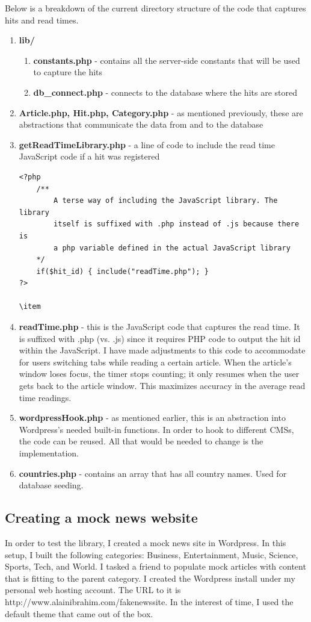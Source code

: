 \documentclass[12pt]{article}
\begin{document}
\newpage

\noindent Below is a breakdown of the current directory structure of the code that captures hits and read times.
\begin{enumerate}
\item \textbf{lib/}
\begin{enumerate}
\item \textbf{constants.php} - contains all the server-side constants that will be used to capture the hits
\item \textbf{db\_connect.php} - connects to the database where the hits are stored
\end{enumerate}
\item \textbf{Article.php, Hit.php, Category.php} - as mentioned previously, these are abstractions that communicate the data from and to the database
\item \textbf{getReadTimeLibrary.php} - a line of code to include the read time JavaScript code if a hit was registered
\begin{lstlisting}[basicstyle=\scriptsize]
<?php 
	/**
		A terse way of including the JavaScript library. The library 
		itself is suffixed with .php instead of .js because there is 
		a php variable defined in the actual JavaScript library
	*/
	if($hit_id) { include("readTime.php"); } 
?>

\item
\end{lstlisting}
\item \textbf{readTime.php} - this is the JavaScript code that captures the read time. It is suffixed with .php (vs. .js) since it requires PHP code to output the hit id within the JavaScript. I have made adjustments to this code to accommodate for users switching tabs while reading a certain article. When the article's window loses focus, the timer stops counting; it only resumes when the user gets back to the article window. This maximizes accuracy in the average read time readings.
\item \textbf{wordpressHook.php} - as mentioned earlier, this is an abstraction into Wordpress's needed built-in functions. In order to hook to different CMSs, the code can be reused. All that would be needed to change is the implementation.
\item \textbf{countries.php} - contains an array that has all country names. Used for database seeding.
\end{enumerate}
\subsection{Creating a mock news website}
In order to test the library, I created a mock news site in Wordpress. In this setup, I built the following categories: Business, Entertainment, Music, Science, Sports, Tech, and World. I tasked a friend to populate mock articles with content that is fitting to the parent category. I created the Wordpress install under my personal web hosting account. The URL to it is http://www.alainibrahim.com/fakenewssite. In the interest of time, I used the default theme that came out of the box. \\
\end{document}
